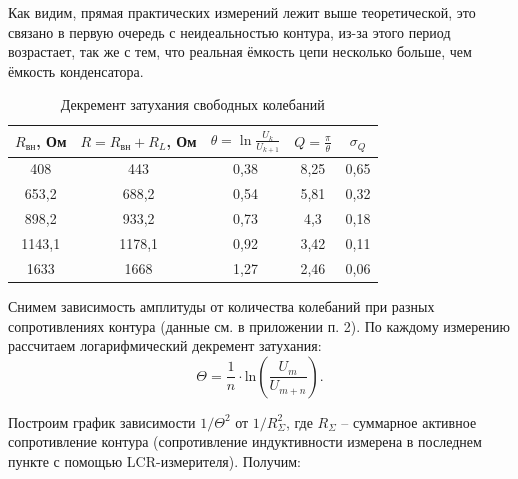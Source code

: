 \documentclass[a4paper,12pt]{extarticle}
\begin{document}
Как видим, прямая практических измерений лежит выше теоретической, это связано в первую очередь с неидеальностью контура, из-за этого период возрастает, так же с тем, что реальная ёмкость цепи несколько больше, чем ёмкость конденсатора.

\begin{table}[h]
        \centering
        \begin{tabular}{|c|c|c|c|c|}
                \hline
                $R_{\text{вн}}$, Ом & $R = R_{\text{вн}} + R_L$, Ом& $\theta = \ln \frac{U_k}{U_{k+1}}$ & $Q = \frac{\pi}{\theta}$ & $\sigma_{Q}$ \\ \hline
                  408 & 443 & 0,38 & 8,25 & 0,65 \\ \hline
                653,2 & 688,2 & 0,54 & 5,81 & 0,32  \\ \hline
                898,2 & 933,2 & 0,73 & 4,3 & 0,18 \\ \hline
                1143,1 & 1178,1 & 0,92 & 3,42 & 0,11 \\ \hline
                1633 & 1668 & 1,27 & 2,46 & 0,06 \\ \hline
        \end{tabular}
        \caption{Декремент затухания свободных колебаний}
\end{table}


Снимем зависимость амплитуды от количества колебаний при разных сопротивлениях контура (данные см. в приложении п. 2). По каждому измерению рассчитаем логарифмический декремент затухания:
\begin{equation}
    \Theta = \frac{1}{n} \cdot \text{ln}(\frac{U_m}{U_{m+n}}).
\end{equation}

Построим график зависимости $1/\Theta^2$ от $1/R_\Sigma ^2$, где $R_\Sigma$ -- суммарное активное сопротивление контура (сопротивление индуктивности измерена в последнем пункте с помощью LCR-измерителя). Получим:
\end{document}
